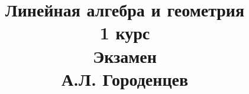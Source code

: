 \documentclass[fleqn]{article}
\title{Линейная алгебра и геометрия \\ 1 курс \\ Экзамен \\ А.Л. Городенцев}
\date{}
\begin{document}
	\maketitle
	\pagebreak	
	\tableofcontents
	
	
	
\end{document}

